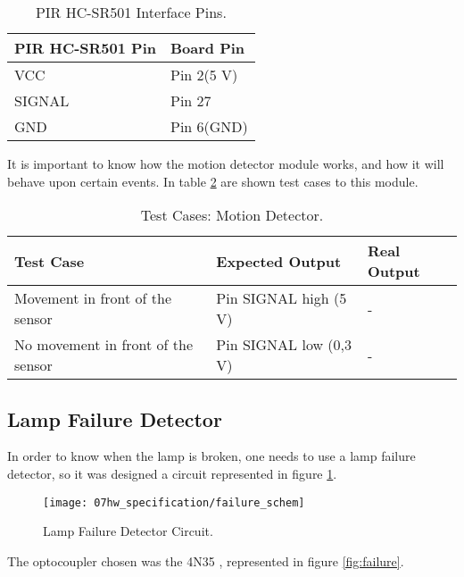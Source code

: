 \begin{table}[H]
	\centering
	\begin{tabular}{|m{5cm}|m{6cm}|}
		\hline
		\textbf{PIR HC-SR501 Pin} & \textbf{Board Pin}
		\\\hline\hline
		
		VCC & Pin 2(5 V)\\\hline
		SIGNAL & Pin 27\\\hline
		GND & Pin 6(GND)\\
		\hline
	\end{tabular}
	
\caption{PIR HC-SR501 Interface Pins.}
\label{table:pir}
\end{table}

It is important to know how the motion detector module works, and how it will behave upon certain events. In table \ref{table:test_pir} are shown test cases to this module.

\begin{table}[H]
	\centering
	\resizebox{\columnwidth}{!}
	{
		\begin{tabular}{|m{3cm}|m{5cm}||m{5cm}|}
			\hline
			\textbf{Test Case} & \textbf{Expected Output} & \textbf{Real Output}
			\\\hline\hline
			Movement in front of the sensor & Pin SIGNAL high (5 V) & -
			\\\hline
			No movement in front of the sensor & Pin SIGNAL low (0,3 V) & -
			\\\hline
		\end{tabular}
	}
	\caption{Test Cases: Motion Detector.}
	\label{table:test_pir}
\end{table}

\clearpage
\subsection{Lamp Failure Detector}
In order to know when the lamp is broken, one needs to use a lamp failure detector, so it was designed a circuit represented in figure \ref{fig:failure_circuit}. 

\begin{figure}[H]
	\centering
	\texttt{[image: 07hw\_specification/failure\_schem]}
	\caption{Lamp Failure Detector Circuit.}
	\label{fig:failure_circuit}
\end{figure}

The optocoupler chosen was the 4N35 \cite{4n35}, represented in figure \ref{fig:failure}.

